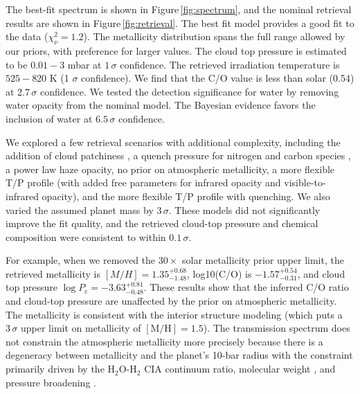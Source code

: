 \documentclass[twocolumn, trackchanges]{aastex61}
\begin{document}

The best-fit spectrum is shown in Figure\,\ref{fig:spectrum}, and the nominal retrieval results are shown in Figure\,\ref{fig:retrieval}.  The best fit model provides a good fit to the data ($\chi^2_\nu = 1.2$).  The metallicity distribution spans the full range allowed by our priors, with preference for larger values. The cloud top pressure is estimated to be $0.01 - 3$ mbar at $1\,\sigma$ confidence. The retrieved irradiation temperature is $525 - 820$ K (1 $\sigma$ confidence).  We find that the C/O value is less than solar (0.54) at $2.7\,\sigma$ confidence.  We tested the detection significance for water by removing water opacity from the nominal model. The Bayesian evidence favors the inclusion of water at $6.5\,\sigma$ confidence. 

We explored a few retrieval scenarios with additional complexity, including the addition of cloud patchiness \citep{line16}, a quench pressure for nitrogen and carbon species \citep[e.g.][]{morley17}, a power law haze opacity, no prior on atmospheric metallicity, a more flexible T/P profile (with added free parameters for infrared opacity and visible-to-infrared opacity), and the more flexible T/P profile with quenching.  We also varied the assumed planet mass by $3\,\sigma$. These models did not significantly improve the fit quality, and the retrieved cloud-top pressure and chemical composition were consistent to within $0.1\,\sigma$.  

For example, when we removed the $30\times$ solar metallicity prior upper limit, the retrieved metallicity is $[M/H] = 1.35^{+0.68}_{-1.48}$, log10(C/O) is $-1.57^{+0.54}_{-0.31}$, and cloud top pressure $\log P_\mathrm{c} = -3.63^{+0.81}_{-0.48}.$ These results show that the inferred C/O ratio and cloud-top pressure are unaffected by the prior on atmospheric metallicity.  The metallicity is consistent with the interior structure modeling (which puts a $3\,\sigma$ upper limit on metallicity of $[\mathrm{M/H}] = 1.5$). The transmission spectrum does not constrain the atmospheric metallicity more precisely because there is a degeneracy between metallicity and the planet's 10-bar radius \citep[e.g]{griffith14,heng17} with the constraint primarily driven by the H$_2$O-H$_2$ CIA continuum ratio, molecular weight \citep{line16}, and pressure broadening \citep{dewit13}. 
\end{document}
